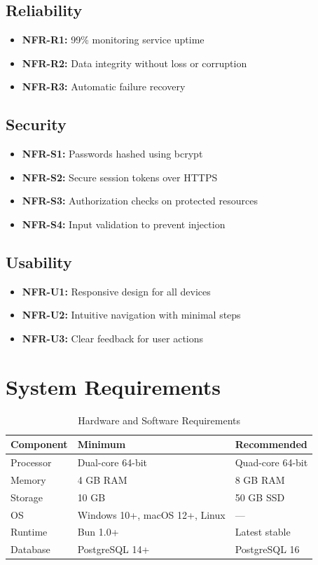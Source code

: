 \subsection{Reliability}
\begin{itemize}
    \item \textbf{NFR-R1:} 99\% monitoring service uptime
    \item \textbf{NFR-R2:} Data integrity without loss or corruption
    \item \textbf{NFR-R3:} Automatic failure recovery
\end{itemize}

\subsection{Security}
\begin{itemize}
    \item \textbf{NFR-S1:} Passwords hashed using bcrypt
    \item \textbf{NFR-S2:} Secure session tokens over HTTPS
    \item \textbf{NFR-S3:} Authorization checks on protected resources
    \item \textbf{NFR-S4:} Input validation to prevent injection
\end{itemize}

\subsection{Usability}
\begin{itemize}
    \item \textbf{NFR-U1:} Responsive design for all devices
    \item \textbf{NFR-U2:} Intuitive navigation with minimal steps
    \item \textbf{NFR-U3:} Clear feedback for user actions
\end{itemize}

\section{System Requirements}

\begin{table}[H]
    \centering
    \caption{Hardware and Software Requirements}
    \label{tab:system-requirements}
    \begin{tabular}{lll}
        \toprule
        \textbf{Component} & \textbf{Minimum} & \textbf{Recommended} \\
        \midrule
        Processor & Dual-core 64-bit & Quad-core 64-bit \\
        Memory & 4 GB RAM & 8 GB RAM \\
        Storage & 10 GB & 50 GB SSD \\
        OS & Windows 10+, macOS 12+, Linux & --- \\
        Runtime & Bun 1.0+ & Latest stable \\
        Database & PostgreSQL 14+ & PostgreSQL 16 \\
        \bottomrule
    \end{tabular}
\end{table}

